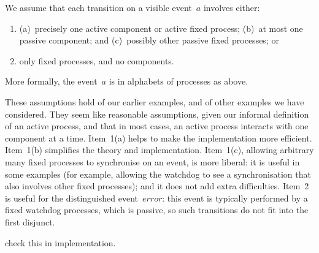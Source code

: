 \begin{assumption}
We assume that each transition on a visible event~$a$ involves either:
\begin{enumerate}
\item (a)~precisely one active component or active fixed process; (b)~at most
  one passive component; and (c)~possibly other passive fixed processes; or

\item only fixed processes, and no components.
\end{enumerate}
%
More formally, the event~$a$ is in alphabets of processes as above. 
\end{assumption}
%
These assumptions hold of our earlier examples, and of other examples we have
considered.  They seem like reasonable assumptions, given our informal
definition of an active process, and that in most cases, an active process
interacts with one component at a time.  Item~1(a) helps to make the
implementation more efficient.  Item~1(b) simplifies the theory and
implementation.  Item~1(c), allowing arbitrary many fixed processes to
synchronise on an event, is more liberal: it is useful in some examples (for
example, allowing the watchdog to see a synchronisation that also involves
other fixed processes); and it does not add extra difficulties.  Item~2 is
useful for the distinguished event~$error$: this event is typically performed
by a fixed watchdog processes, which is passive, so such transitions do not
fit into the first disjunct.


\begin{improve}
check this in implementation.
\end{improve}

